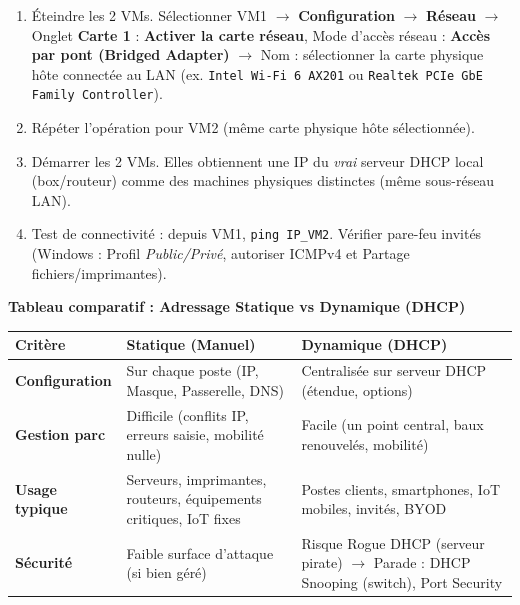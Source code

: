 \documentclass[11pt]{article}
\newcommand{\cle}[1]{{\popxbold\color{popdark}#1}}
\begin{document}
\begin{aretenir}
\begin{methode}
\begin{enumerate}
    \item Éteindre les 2 VMs. Sélectionner VM1 $\rightarrow$ \textbf{Configuration} $\rightarrow$ \textbf{Réseau} $\rightarrow$ Onglet \textbf{Carte 1} : \textbf{Activer la carte réseau}, Mode d'accès réseau : \textbf{Accès par pont (Bridged Adapter)} $\rightarrow$ Nom : sélectionner la carte physique hôte connectée au LAN (ex. \texttt{Intel Wi-Fi 6 AX201} ou \texttt{Realtek PCIe GbE Family Controller}).
    \item Répéter l'opération pour VM2 (même carte physique hôte sélectionnée).
    \item Démarrer les 2 VMs. Elles obtiennent une IP du \emph{vrai} serveur DHCP local (box/routeur) comme des machines physiques distinctes (même sous-réseau LAN).
    \item Test de connectivité : depuis VM1, \texttt{ping IP\_VM2}. Vérifier pare-feu invités (Windows : Profil \emph{Public/Privé}, autoriser ICMPv4 et Partage fichiers/imprimantes).
\end{enumerate}
\end{methode}

\textbf{Tableau comparatif : Adressage Statique vs Dynamique (DHCP)}
\begin{center}
\begin{tabularx}{\linewidth}{|>{\bfseries}l|X|X|}
\hline
\rowcolor{popblueL}
\textbf{Critère} & \textbf{Statique (Manuel)} & \textbf{Dynamique (DHCP)} \\
\hline
Configuration & Sur chaque poste (IP, Masque, Passerelle, DNS) & Centralisée sur serveur DHCP (étendue, options) \\
\hline
Gestion parc & Difficile (conflits IP, erreurs saisie, mobilité nulle) & Facile (un point central, baux renouvelés, mobilité) \\
\hline
Usage typique & Serveurs, imprimantes, routeurs, équipements critiques, IoT fixes & Postes clients, smartphones, IoT mobiles, invités, BYOD \\
\hline
Sécurité & Faible surface d'attaque (si bien géré) & Risque \cle{Rogue DHCP} (serveur pirate) $\rightarrow$ Parade : \cle{DHCP Snooping} (switch), \cle{Port Security} \\
\hline
\end{tabularx}
\end{center}


\end{aretenir}
\end{document}
